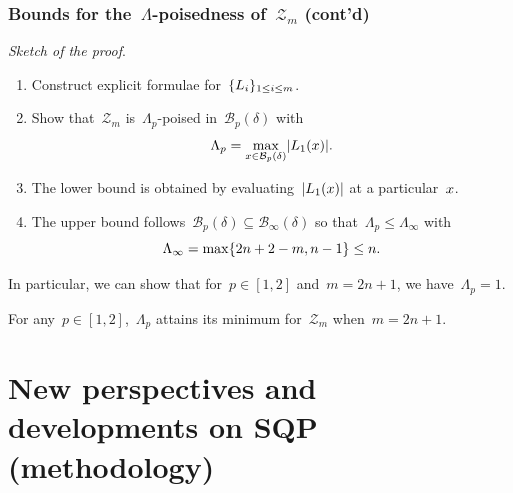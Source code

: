 \documentclass{polyu-presentation}
\newcommand{\iter}[1][]{x\ifthenelse{\equal{#1}{}}{}{^{#1}}}
\newcommand{\lagp}[1][]{L\ifthenelse{\equal{#1}{}}{}{_{#1}}}
\begin{document}
\begin{frame}
    \frametitle{Bounds for the~$\Lambda$-poisedness of~$\mathcal{Z}_m$ (cont'd)}

    \emph{Sketch of the proof}.
    \begin{enumerate}
        \item Construct explicit formulae for~$\set{\lagp[i]}_{1 \le i \le m}$.
        \item Show that~$\mathcal{Z}_m$ is~$\Lambda_p$-poised in~$\mathcal{B}_p(\delta)$ with
        \begin{equation*}
            \Lambda_p = \max_{\iter \in \mathcal{B}_p(\delta)} \abs{\lagp[1](\iter)}.
        \end{equation*}
        \item The lower bound is obtained by evaluating~$\abs{\lagp[1](\iter)}$ at a particular~$\iter$.
        \item The upper bound follows~$\mathcal{B}_p(\delta) \subseteq \mathcal{B}_{\infty}(\delta)$ so that~$\Lambda_p \le \Lambda_{\infty}$ with
        \begin{equation*}
            \Lambda_{\infty} = \max \{2n + 2 - m, n - 1\} \le n.
        \end{equation*}
    \end{enumerate}

    \medskip

    In particular, we can show that for~$p \in [1, 2]$ and~$m = 2n + 1$, we have~$\Lambda_p = 1$.

    \medskip

    \begin{block}{}
        For any~$p \in [1, 2]$,~$\Lambda_p$ attains its \alert{minimum} for~$\mathcal{Z}_m$ when~$m = 2n + 1$.
    \end{block}
\end{frame}

\section{New perspectives and developments on SQP (\textbf{methodology})}
\end{document}
